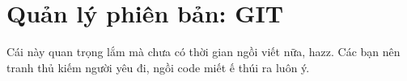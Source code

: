 \chapter{Quản lý phiên bản: GIT}

Cái này quan trọng lắm mà chưa có thời gian ngồi viết nữa, hazz. Các bạn nên tranh thủ kiếm người yêu đi, ngồi code miết ế thúi ra luôn ý.
\newpage
